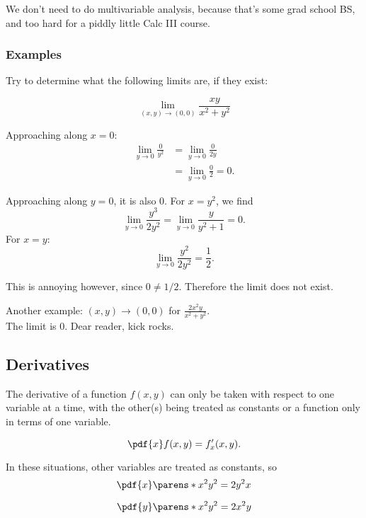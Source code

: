 \documentclass{article}
\begin{document}
We don't need to do multivariable analysis, because that's some grad school BS, and too hard for a piddly little Calc III course.

\subsubsection{Examples}
Try to determine what the following limits are, if they exist:

\[
  \lim_{(x, y) \to (0, 0)} \frac{xy}{x^{2} + y^{2}}
\]

Approaching along $x = 0$:
\begin{align*}
  \lim_{y \to 0} \frac{0}{y^{2}} &= \lim_{y \to 0} \frac{0}{2y}\\
  &= \lim_{y \to 0} \frac{0}{2} = 0.
\end{align*}

Approaching along $y = 0$, it is also 0.
For $x = y^{2}$, we find
\begin{equation*}
  \lim_{y \to 0}\frac{y^{3}}{2y^{2}} = \lim_{y \to 0}\frac{y}{y^{2} + 1} = 0.
\end{equation*}
For $x = y$:
\begin{equation*}
  \lim_{y \to 0}\frac{y^{2}}{2y^{2}} = \frac{1}{2}.
\end{equation*}

This is annoying however, since $0 \ne 1/2$. Therefore the limit does not exist.

Another example: $(x, y) \to (0, 0)$ for $\frac{2x^{2}y}{x^{2} + y^{2}}$.\\
The limit is 0. Dear reader, kick rocks.

\subsection{Derivatives}

The derivative of a function $f(x, y)$ can only be taken with respect to one variable at a time, with the other(s) being
treated as constants or a function only in terms of one variable.

\begin{equation}
  \pdf{x}f(x, y) = f'_{x}(x, y).
\end{equation}

In these situations, other variables are treated as constants, so
\begin{equation}
  \pdf{x}\parens*{x^{2}y^{2}} = 2y^{2}x
\end{equation}

\begin{equation}
  \pdf{y}\parens*{x^{2}y^{2}} = 2x^{2}y
\end{equation}
\end{document}
